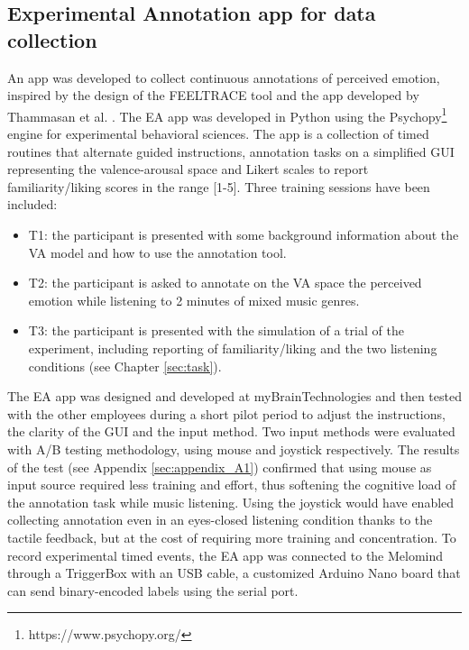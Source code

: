 \subsection{Experimental Annotation app for data collection}
\label{sec:experimental_annotation_app}
An app was developed to collect continuous annotations of perceived emotion, inspired by the design of the FEELTRACE tool \cite{cowie_feeltrace_2000} and the app developed by Thammasan et al. \cite{thammasan_continuous_2016}. The \ac{EA} app was developed in Python using the Psychopy\footnote{https://www.psychopy.org/}  engine for experimental behavioral sciences. The app is a collection of timed routines that alternate guided instructions, annotation tasks on a simplified GUI representing the valence-arousal space and Likert scales to report familiarity/liking scores in the range [1-5]. Three training sessions have been included:
\begin{itemize}
\item T1: the participant is presented with some background information about the \ac{VA} model and how to use the annotation tool.
\item T2: the participant is asked to annotate on the \ac{VA} space the perceived emotion while listening to 2 minutes of mixed music genres.
\item T3: the participant is presented with the simulation of a trial of the experiment, including reporting of familiarity/liking and the two listening conditions (see Chapter \ref{sec:task}).
\end{itemize}

The \ac{EA} app was designed and developed at myBrainTechnologies and then tested with the other employees during a short pilot period to adjust the instructions, the clarity of the GUI and the input method. Two input methods were evaluated with A/B testing methodology, using mouse and joystick respectively. The results of the test (see Appendix \ref{sec:appendix_A1}) confirmed that using mouse as input source required less training and effort, thus softening the cognitive load of the annotation task while music listening. Using the joystick would have enabled collecting annotation even in an eyes-closed listening condition thanks to the tactile feedback, but at the cost of requiring more training and concentration. To record experimental timed events, the \ac{EA} app was connected to the Melomind through a TriggerBox with an USB cable, a customized Arduino Nano board that can send binary-encoded labels using the serial port. 

